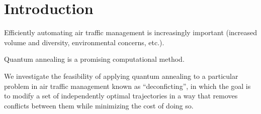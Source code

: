 \section{Introduction}
Efficiently automating air traffic management is increasingly important (increased volume and diversity, environmental concerns, etc.).


Quantum annealing is a promising computational method.

We investigate the feasibility of applying quantum annealing to a particular problem in air traffic management known as ``deconficting'', in which the goal is to modify a set of independently optimal trajectories in a way that removes conflicts between them while minimizing the cost of doing so.



